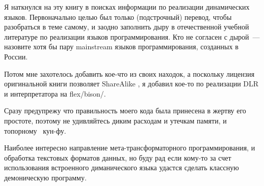 \secdown{}

Я наткнулся на эту книгу в поисках информации по реализации динамических языков.
Первоначально целью был только (подстрочный) перевод, чтобы разобраться в теме
самому, и заодно заполнить дыру в отечественной учебной литературе по реализации
языков программирования. Кто не согласен с дырой\ --- назовите хотя бы пару
mainstream  языков программирования, созданных в России.

Потом мне захотелось добавить кое-что из своих находок, а поскольку лицензия
оригинальной книги
позволяет ShareAlike , я добавил кое-то по реализации
DLR и интерпретатора на flex/bison/\cpp.

Сразу предупрежу что правильность моего кода была принесена в жертву его
простоте, поэтому не удивляйтесь диким расходам и утечкам памяти, и топорному
\cpp\ кун-фу.

Наиболее интересно направление мета-трансформаторного программирования, и
обработка текстовых форматов данных, но буду рад если кому-то за счет
использования встроенного диманического языка удастся сделать классную
демоническую программу.

\secup